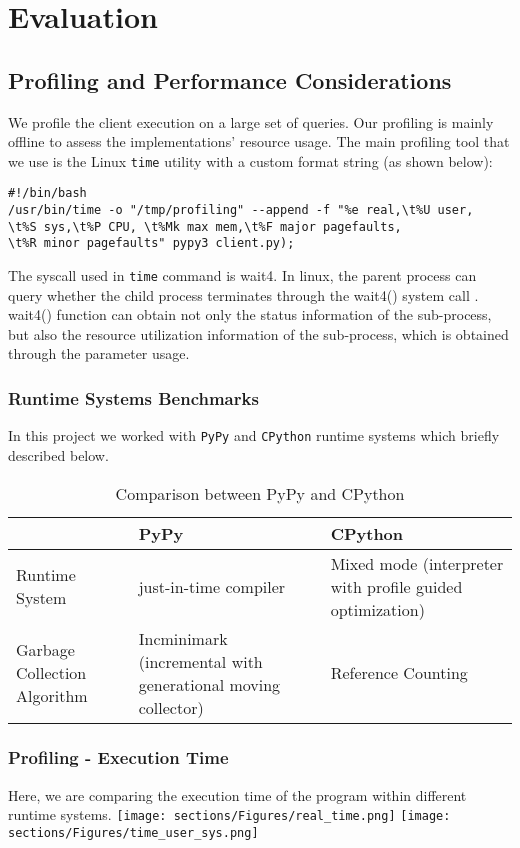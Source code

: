 \section{Evaluation}
\label{sec:Eval}
\subsection{Profiling and Performance Considerations}
We profile the client execution on a large set of queries. Our profiling is mainly offline to assess the implementations' resource usage. The main profiling tool that we use is the Linux \texttt{time} utility with a custom format string (as shown below):
\begin{lstlisting}
#!/bin/bash
/usr/bin/time -o "/tmp/profiling" --append -f "%e real,\t%U user,
\t%S sys,\t%P CPU, \t%Mk max mem,\t%F major pagefaults,
\t%R minor pagefaults" pypy3 client.py);
\end{lstlisting}

The syscall used in \texttt{time} command is wait4. In linux, the parent process can query whether the child process terminates through the wait4() system call \cite{wait4}. wait4() function can obtain not only the status information of the sub-process, but also the resource utilization information of the sub-process, which is obtained through the parameter usage. 

\subsubsection{Runtime Systems Benchmarks}
In this project we worked with \texttt{PyPy} and \texttt{CPython} runtime systems which briefly described below.
\begin{center}
\begin{table}[h]
 \caption{Comparison between PyPy and CPython}
\begin{tabular}{ | l | p{5cm} |p{5cm} |} 
 \hline
  & PyPy \cite{pypy}  & CPython \cite{cpython} \\ 
  \hline
  Runtime System & just-in-time compiler & Mixed mode (interpreter with profile guided optimization)  \\ 
  \hline
 Garbage Collection Algorithm & Incminimark (incremental with generational moving collector) & Reference Counting \\ 
 \hline
\end{tabular}
\end{table}
\end{center}

\subsubsection{Profiling - Execution Time}
Here, we are comparing the execution time of the program within different runtime systems. 
\hspace*{-0.8in}
\texttt{[image: sections/Figures/real\_time.png]}
\texttt{[image: sections/Figures/time\_user\_sys.png]}


